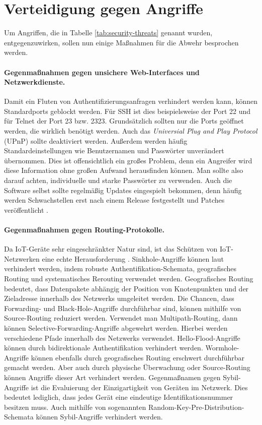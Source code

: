 \section{Verteidigung gegen Angriffe}\label{sec:defense-against-attacks}
Um Angriffen, die in Tabelle \ref{tab:security-threats} genannt wurden,
entgegenzuwirken, sollen nun einige Maßnahmen für die Abwehr besprochen werden.

\paragraph{Gegenmaßnahmen gegen unsichere Web-Interfaces und Netzwerkdienste.}
Damit ein Fluten von Authentifizierungsanfragen verhindert werden kann, können
Standardports geblockt werden. Für SSH ist dies beispielsweise der Port 22 und
für Telnet der Port 23 bzw. 2323. Grundsätzlich sollten nur die Ports geöffnet
werden, die wirklich benötigt werden. Auch das \textit{Universial Plug and Play
Protocol} (UPnP) sollte deaktiviert werden. Außerdem werden häufig
Standardeinstellungen wie Benutzernamen und Passwörter unverändert übernommen.
Dies ist offensichtlich ein großes Problem, denn ein Angreifer wird diese
Information ohne großen Aufwand herausfinden können. Man sollte also darauf
achten, individuelle und starke Passwörter zu verwenden. Auch die Software
selbst sollte regelmäßig Updates eingespielt bekommen, denn häufig werden
Schwachstellen erst nach einem Release festgestellt und Patches veröffentlicht
\cite{paper}.

\paragraph{Gegenmaßnahmen gegen Routing-Protokolle.}
Da IoT-Geräte sehr eingeschränkter Natur sind, ist das Schützen von
IoT-Netzwerken eine echte Herausforderung \cite{patel2016}. Sinkhole-Angriffe
können laut \cite{paper} verhindert werden, indem robuste
Authentifikation-Schemata, geografisches Routing und systematisches Rerouting
verwendet werden.  Geografisches Routing bedeutet, dass Datenpakete abhängig der
Position von Knotenpunkten und der Zieladresse innerhalb des Netzwerks
umgeleitet werden.  Die Chancen, dass Forwarding- und Black-Hole-Angriffe
durchführbar sind, können mithilfe von Source-Routing reduziert werden.
Verwendet man Multipath-Routing, dann können Selective-Forwarding-Angriffe
abgewehrt werden. Hierbei werden verschiedene Pfade innerhalb des Netzwerks
verwendet. Hello-Flood-Angriffe können durch bidirektionale Authentifikation
verhindert werden.  Wormhole-Angriffe können ebenfalls durch geografisches
Routing erschwert durchführbar gemacht werden. Aber auch durch physische
Überwachung oder Source-Rou\-ting können Angriffe dieser Art verhindert werden.
Gegenmaßnamen gegen Sybil-Angriffe ist die Evaluierung der Einzigartigkeit von
Geräten im Netzwerk.  Dies bedeutet lediglich, dass jedes Gerät eine eindeutige
Identifikationsnummer besitzen muss. Auch mithilfe von sogenannten
Random-Key-Pre-Dis\-tri\-bu\-tion-Schemata \cite{chan2003} können Sybil-Angriffe
verhindert werden.

